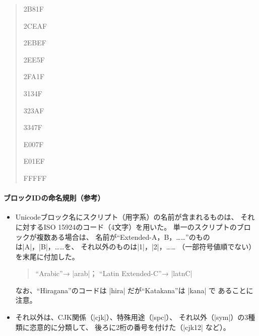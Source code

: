\documentclass[uplatex,dvipdfmx,a4paper]{jsarticle}
\begin{document}
\begin{quote}
   {2B81F} \par
{}   {2CEAF} \par
{}   {2EBEF} \par
{}   {2EE5F} \par
{}   {2FA1F} \par
{}   {3134F} \par
{}   {323AF} \par
{}   {3347F} \par
{}   {E007F} \par
{}   {E01EF} \par
{}   {FFFFF} \par
{}   \par
\end{quote}

\paragraph{ブロックIDの命名規則\<（参考）}
\mbox{}
\begin{itemize}
\item Unicodeブロック名にスクリプト（用字系）の名前が含まれるものは、
  それに対するISO 15924のコード（4文字）を用いた。
  単一のスクリプトのブロックが複数ある場合は、
  名前が“Extended-A，B，……”のものは|A|，|B|，……を、
  それ以外のものは|1|，|2|，……
  （一部符号値順でない）を末尾に付加した。
  \begin{quote}
  “Arabic”→ |arab|； “Latin Extended-C”→ |latnC|
  \end{quote}
  なお、“Hiragana”のコードは |hira| だが“Katakana”は |kana| で
  あることに注意。
\item それ以外は、CJK関係（|cjk|）、特殊用途（|spc|）、
  それ以外（|sym|）の3種類に恣意的に分類して、
  後ろに2桁の番号を付けた（|cjk12| など）。
\end{itemize}
\end{document}
